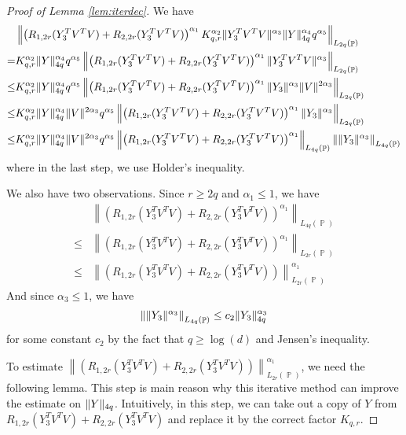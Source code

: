 \documentclass[11pt]{amsart}
\numberwithin{equation}{section}
\numberwithin{equation}{section}
\DeclareMathOperator{\Pb}{\mathbb{P}}
\DeclarePairedDelimiter{\norm}{\lVert}{\rVert}
\newcommand{\norml}[1]{\left\lVert#1\right\rVert}
\begin{document}
\begin{proof}[Proof of Lemma \ref{lem:iterdec}]
We have
\begin{align*}
    &\norml{\left(R_{1,2r}(Y_3^TV^TV)+R_{2,2r}(Y_3^TV^TV)\right)^{\alpha_1}K_{q,r}^{\alpha_2}\norm{Y_3^TV^TV}^{\alpha_3} \norm{Y}_{4q} ^{\alpha_4}q^{\alpha_5}}_{L_{2q}(\Pb)}
    \\=&K_{q,r}^{\alpha_2}\norm{Y}_{4q}^{\alpha_4}q^{\alpha_5}\norml{\left(R_{1,2r}(Y_3^TV^TV)+R_{2,2r}(Y_3^TV^TV)\right)^{\alpha_1}\norm{Y_3^TV^TV}^{\alpha_3}  }_{L_{2q}(\Pb)}
    \\ \le &K_{q,r}^{\alpha_2}\norm{Y}_{4q}^{\alpha_4}q^{\alpha_5}\norml{\left(R_{1,2r}(Y_3^TV^TV)+R_{2,2r}(Y_3^TV^TV)\right)^{\alpha_1}\norm{Y_3}^{\alpha_3} \norm{V}^{2 \alpha_3}  }_{L_{2q}(\Pb)}
    \\ \le &K_{q,r}^{\alpha_2}\norm{Y}_{4q}^{\alpha_4}\norm{V}^{2 \alpha_3}q^{\alpha_5}\norml{\left(R_{1,2r}(Y_3^TV^TV)+R_{2,2r}(Y_3^TV^TV)\right)^{\alpha_1}\norm{Y_3}^{\alpha_3}   }_{L_{2q}(\Pb)}
    \\ \le &K_{q,r}^{\alpha_2}\norm{Y}_{4q}^{\alpha_4}\norm{V}^{2 \alpha_3}q^{\alpha_5}\norml{\left(R_{1,2r}(Y_3^TV^TV)+R_{2,2r}(Y_3^TV^TV)\right)^{\alpha_1}}_{L_{4q}(\Pb)}\norml{\norm{Y_3}^{\alpha_3}   }_{L_{4q}(\Pb)}
\end{align*}
where in the last step, we use Holder's inequality.

We also have two observations. Since $r \ge 2q$ and $\alpha_1 \le 1$, we have
\begin{align*}
    &\norml{\left(R_{1,2r}(Y_3^TV^TV)+R_{2,2r}(Y_3^TV^TV)\right)^{\alpha_1}}_{L_{4q}(\Pb)}
    \\ \le & \norml{\left(R_{1,2r}(Y_3^TV^TV)+R_{2,2r}(Y_3^TV^TV)\right)^{\alpha_1}}_{L_{2r}(\Pb)}
    \\ \le & \norml{\left(R_{1,2r}(Y_3^TV^TV)+R_{2,2r}(Y_3^TV^TV)\right)}_{L_{2r}(\Pb)}^{\alpha_1}
\end{align*}
And since $\alpha_3 \le 1$, we have
\begin{align*}
    \norml{\norm{Y_3}^{\alpha_3}   }_{L_{4q}(\Pb)} \le c_2\norm{Y_3}_{4q}^{\alpha_3}
\end{align*}
for some constant $c_2$ by the fact that $q \ge \log(d)$ and Jensen's inequality.

To estimate $\norml{\left(R_{1,2r}(Y_3^TV^TV)+R_{2,2r}(Y_3^TV^TV)\right)}_{L_{2r}(\Pb)}^{\alpha_1}$, we need the following lemma. This step is main reason why this iterative method can improve the estimate on $\norm{Y}_{4q}$. Intuitively, in this step, we can take out a copy of $Y$ from $R_{1,2r}(Y_3^TV^TV)+R_{2,2r}(Y_3^TV^TV)$ and replace it by the correct factor $K_{q,r}$.


\end{proof}
\end{document}
